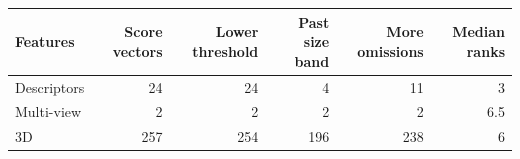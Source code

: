 \begin{tabular}{lrrrrr}
\toprule
Features & Score vectors & Lower threshold & Past size band & More omissions & Median ranks \\
\midrule
Descriptors & 24 & 24 & 4 & 11 & 3 \\
Multi-view & 2 & 2 & 2 & 2 & 6.5 \\
3D & 257 & 254 & 196 & 238 & 6 \\
\bottomrule
\end{tabular}
